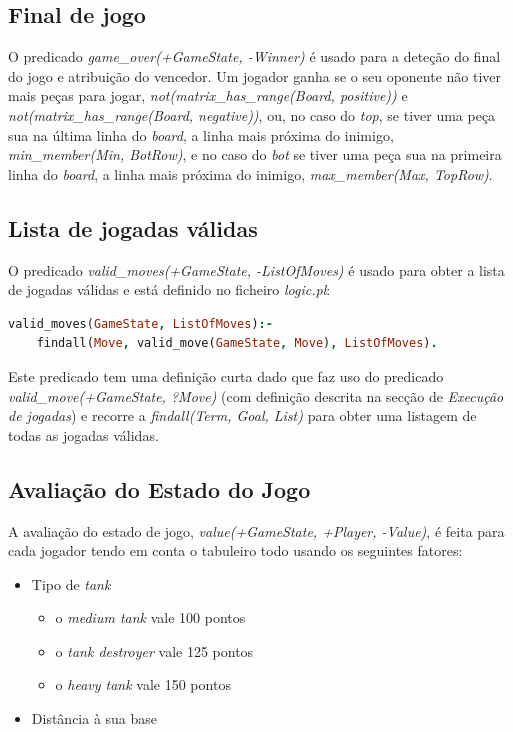\documentclass[a4paper,11pt,portuguese]{article}
\begin{document}
    \subsection{Final de jogo}

    O predicado \textit{game\_over(+GameState, -Winner)} é usado para a deteção do final
    do jogo e atribuição do vencedor. Um jogador ganha se o seu oponente não tiver mais 
    peças para jogar, \textit{not(matrix\_has\_range(Board, positive))} e 
    \textit{not(matrix\_has\_range(Board, negative))}, ou, no caso do \textit{top}, se
    tiver uma peça sua na última linha do \textit{board}, a linha mais próxima do inimigo, 
    \textit{min\_member(Min, BotRow)}, e no caso do \textit{bot} se tiver uma peça sua
    na primeira linha do \textit{board}, a linha mais próxima do inimigo, 
    \textit{max\_member(Max, TopRow)}.


    \subsection{Lista de jogadas válidas}

    O predicado \textit{valid\_moves(+GameState, -ListOfMoves)} é usado para obter a
    lista de jogadas válidas e está definido no ficheiro \textit{logic.pl}:

\begin{lstlisting}[language=prolog]
% valid_moves(+GameState, -ListOfMoves)
valid_moves(GameState, ListOfMoves):-
    findall(Move, valid_move(GameState, Move), ListOfMoves).
\end{lstlisting}

    \noindent Este predicado tem uma definição curta dado que faz uso do predicado
    \textit{valid\_move(+GameState, ?Move) } (com definição descrita na secção de
    \textit{Execução de jogadas}) e recorre a \textit{findall(Term, Goal, List)}
    para obter uma listagem de todas as jogadas válidas.


    \subsection{Avaliação do Estado do Jogo}

    A avaliação do estado de jogo, \textit{value(+GameState, +Player, -Value)}, é feita
    para cada jogador tendo em conta o tabuleiro todo usando os seguintes fatores:
    \begin{itemize}
        \item Tipo de \textit{tank}
        \begin{itemize}
            \item o \textit{medium tank} vale 100 pontos
            \item o \textit{tank destroyer} vale 125 pontos
            \item o \textit{heavy tank} vale 150 pontos
        \end{itemize}
        \item Distância à sua base
    \end{itemize}
\end{document}
